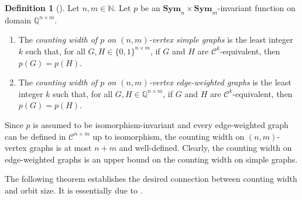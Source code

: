 \documentclass[11pt, DIV=15]{scrarticle}
\theoremstyle{definition}
\newtheorem{definition}{Definition}[section]
\theoremstyle{plain}
\theoremstyle{remark}
\newcommand{\Sym}{\mathbf{Sym}}
\begin{document}
	\begin{definition}[\cite{dawar_definability_2017}]
		\label{def:counting-width}
		Let $n,m\in \mathbb{N}$.
		Let $p$ be an $\Sym_n \times \Sym_m$-invariant function on domain $\mathbb{Q}^{n \times m}$. 
		\begin{enumerate}
			\item The \emph{counting width of $p$ on $(n,m)$-vertex simple graphs} is the least integer $k$ such that, for all $G, H \in \{0,1\}^{n \times m}$, if $G$ and $H$ are $\mathcal{C}^k$-equivalent, then $p(G) = p(H)$.
			\item The \emph{counting width of $p$ on $(n,m)$-vertex edge-weighted graphs} is the least integer $k$ such that, for all $G, H \in \mathbb{Q}^{n \times m}$, if $G$ and $H$ are $\mathcal{C}^k$-equivalent, then $p(G) = p(H)$.
		\end{enumerate}
	\end{definition} 
	
	Since $p$ is assumed to be isomorphism-invariant and every edge-weighted graph can be defined in $\mathcal{C}^{n+m}$ up to isomorphism, the counting width on $(n,m)$-vertex graphs is at most $n+m$ and well-defined.
	Clearly, the counting width on edge-weighted graphs is an upper bound on the counting width on simple graphs.
	
	The following theorem establishes the desired connection between counting width and orbit size.	
	It is essentially due to \textcite{anderson_symmetric_2017}.
	
\end{document}
